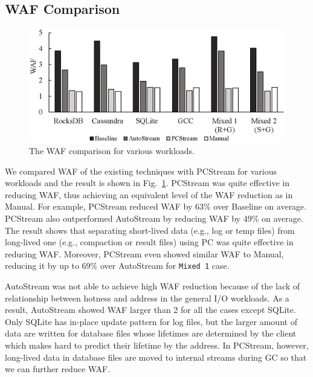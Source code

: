 \subsection{WAF Comparison}

\begin{figure}[t]
	\centering
	\includegraphics[width=0.9\linewidth]{figure/WAF}
	\caption{The WAF comparison for various workloads.}
	\label{fig:waf}
\end{figure}


We compared WAF of the existing techniques with \textsf{\small PCStream} for 
various workloads and the result is shown in Fig.~\ref{fig:waf}.  
\textsf{\small PCStream} was quite effective in reducing WAF, 
thus achieving an equivalent level of the WAF reduction as in \textsf{\small Manual}.  
For example, \textsf{\small PCStream}  
reduced WAF by 63\% over \textsf{\small Baseline} on average.
\textsf{\small PCStream} also outperformed \textsf{\small AutoStream} 
by reducing WAF by 49\% on average.
The result shows that separating short-lived data (e.g., log or temp files) 
from long-lived one (e.g., compaction or result files) 
using PC was quite effective in reducing WAF.  
Moreover, \textsf{\small PCStream} even showed similar WAF to \textsf{\small Manual}, 
reducing it by up to 69\% over \textsf{\small AutoStream} for \texttt{Mixed 1} case.

AutoStream was not able to achieve high WAF reduction because of 
the lack of relationship between hotness and address in the general I/O workloads.
As a result, AutoStream showed WAF larger than 2 for all the cases except SQLite.
Only SQLite has in-place update pattern for log files, but the larger amount of data are
written for database files whose lifetimes are determined by the client
which makes hard to predict their lifetime by the address.
In PCStream, however, long-lived data in database files are moved to internal streams
during GC so that we can further reduce WAF.

